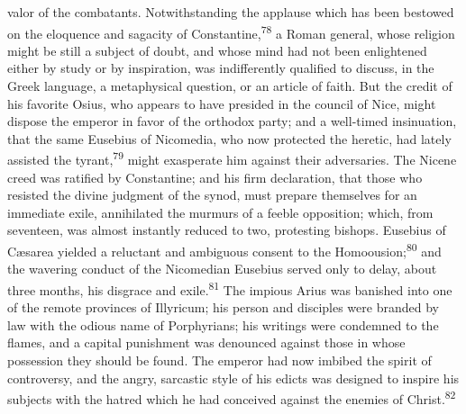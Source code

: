 valor of the combatants. Notwithstanding the applause which has
been bestowed on the eloquence and sagacity of Constantine,\textsuperscript{78} a
Roman general, whose religion might be still a subject of doubt,
and whose mind had not been enlightened either by study or by
inspiration, was indifferently qualified to discuss, in the Greek
language, a metaphysical question, or an article of faith. But
the credit of his favorite Osius, who appears to have presided in
the council of Nice, might dispose the emperor in favor of the
orthodox party; and a well-timed insinuation, that the same
Eusebius of Nicomedia, who now protected the heretic, had lately
assisted the tyrant,\textsuperscript{79} might exasperate him against their
adversaries. The Nicene creed was ratified by Constantine; and
his firm declaration, that those who resisted the divine judgment
of the synod, must prepare themselves for an immediate exile,
annihilated the murmurs of a feeble opposition; which, from
seventeen, was almost instantly reduced to two, protesting
bishops. Eusebius of Cæsarea yielded a reluctant and ambiguous
consent to the Homoousion;\textsuperscript{80} and the wavering conduct of the
Nicomedian Eusebius served only to delay, about three months, his
disgrace and exile.\textsuperscript{81} The impious Arius was banished into one of
the remote provinces of Illyricum; his person and disciples were
branded by law with the odious name of Porphyrians; his writings
were condemned to the flames, and a capital punishment was
denounced against those in whose possession they should be found.
The emperor had now imbibed the spirit of controversy, and the
angry, sarcastic style of his edicts was designed to inspire his
subjects with the hatred which he had conceived against the
enemies of Christ.\textsuperscript{82}



